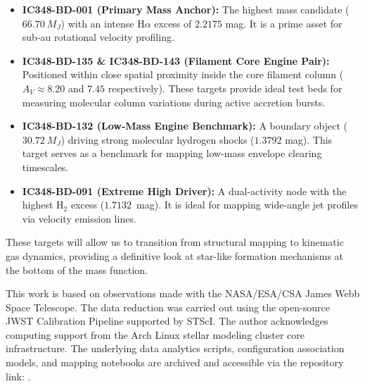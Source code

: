\documentclass[twocolumn]{aastex63}
\begin{document}
\begin{itemize}
\item \textbf{IC348-BD-001 (Primary Mass Anchor):} The highest mass candidate ($66.70~M_J$) with an intense H$\alpha$ excess of $2.2175$ mag. It is a prime asset for sub-au rotational velocity profiling.
\item \textbf{IC348-BD-135 \& IC348-BD-143 (Filament Core Engine Pair):} Positioned within close spatial proximity inside the core filament column ($A_V \approx 8.20$ and $7.45$ respectively). These targets provide ideal test beds for measuring molecular column variations during active accretion bursts.
\item \textbf{IC348-BD-132 (Low-Mass Engine Benchmark):} A boundary object ($30.72~M_J$) driving strong molecular hydrogen shocks ($1.3792$ mag). This target serves as a benchmark for mapping low-mass envelope clearing timescales.
\item \textbf{IC348-BD-091 (Extreme High Driver):} A dual-activity node with the highest H$_2$ excess ($1.7132$~mag). It is ideal for mapping wide-angle jet profiles via velocity emission lines.
\end{itemize}
These targets will allow us to transition from structural mapping to kinematic gas dynamics, providing a definitive look at star-like formation mechanisms at the bottom of the mass function.

\acknowledgments
This work is based on observations made with the NASA/ESA/CSA James Webb Space Telescope. The data reduction was carried out using the open-source JWST Calibration Pipeline supported by STScI. The author acknowledges computing support from the Arch Linux stellar modeling cluster core infrastructure. The underlying data analytics scripts, configuration association models, and mapping notebooks are archived and accessible via the repository link: .
\end{document}
